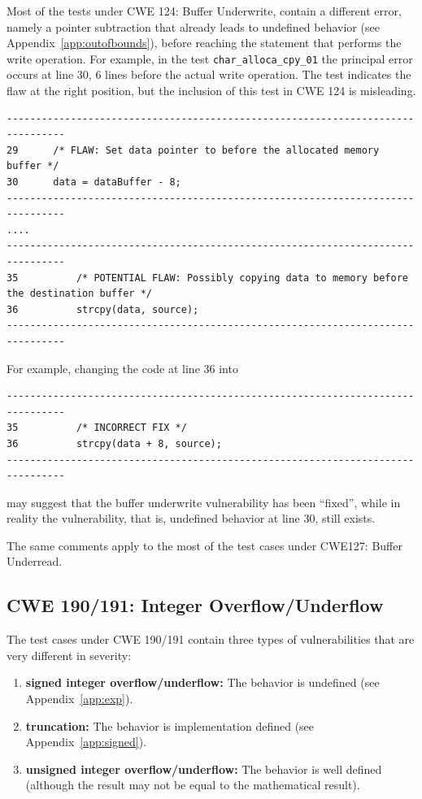 \documentclass[11pt]{article}
\begin{document}
Most of the tests under CWE 124: Buffer Underwrite, contain a different error,
namely a pointer subtraction that already leads to undefined 
behavior (see Appendix~\ref{app:outofbounds}), before
reaching the statement that performs the write operation. For example, in
the test {\tt char\_alloca\_cpy\_01} the principal error occurs at line 30,
6 lines before the actual write operation. The test indicates the flaw at
the right position, but the inclusion of this test in CWE 124 is misleading.
\begin{tiny}
\begin{verbatim}
--------------------------------------------------------------------------------
29      /* FLAW: Set data pointer to before the allocated memory buffer */
30      data = dataBuffer - 8;
--------------------------------------------------------------------------------
....
--------------------------------------------------------------------------------
35          /* POTENTIAL FLAW: Possibly copying data to memory before the destination buffer */
36          strcpy(data, source);
--------------------------------------------------------------------------------
\end{verbatim}
\end{tiny}

For example, changing the code at line 36 into
\begin{tiny}
\begin{verbatim}
--------------------------------------------------------------------------------
35          /* INCORRECT FIX */
36          strcpy(data + 8, source);
--------------------------------------------------------------------------------
\end{verbatim}
\end{tiny}
may suggest that the buffer underwrite vulnerability has been ``fixed'',  while in
reality the vulnerability, that is, undefined behavior at line 30, still exists.

The same comments apply to the most of the test cases under CWE127: Buffer Underread.

\subsection{CWE 190/191: Integer Overflow/Underflow}

The test cases under CWE 190/191 contain three types of vulnerabilities that are very different
in severity:
\begin{enumerate}
\item {\bf signed integer overflow/underflow:} The behavior is undefined (see Appendix~\ref{app:exp}).
\item {\bf truncation:} The behavior is implementation defined (see Appendix~\ref{app:signed}).
\item {\bf unsigned integer overflow/underflow:} The behavior is well defined (although the result may
not be equal to the mathematical result).
\end{enumerate}
\end{document}
